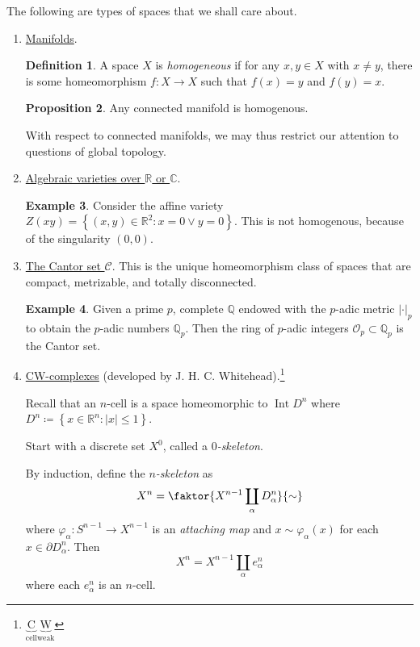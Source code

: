 \documentclass[10pt,letterpaper,cm]{nupset}
\theoremstyle{definition}
\newtheorem{definition}{Definition}[subsection]
\newtheorem{exmp}[definition]{Example}
\theoremstyle{theorem}
\newtheorem{prop}[definition]{Proposition}
\theoremstyle{remark}
\newcommand{\C}{\mathbb C}
\newcommand{\Q}{\mathbb Q}
\newcommand{\R}{\mathbb{R}}
\newcommand{\1}{\mathbb{1}}
\newcommand{\0}{\vec 0}
\DeclareMathOperator{\Int}{Int}
\begin{document}
The following are types of spaces that we shall care about.
\begin{enumerate}
\item \underline{Manifolds}.
\begin{definition}
A space $X$ is \textit{homogeneous} if for any $x,y \in X$ with $x\ne y$, there is some homeomorphism $f: X \to X$ such that $f(x)= y$ and $f(y) =x$.
\end{definition}
\begin{prop}
Any connected manifold is homogenous. 
\end{prop}
With respect to connected manifolds, we may thus restrict our attention to questions of global topology.
\item \underline{Algebraic varieties over $\R$ or $\C$}.
\begin{exmp}
Consider the affine variety $Z(xy) =\left\{\left(x, y\right) \in \R^2 : x=0 \lor y=0\right\}$. This is not homogenous, because of the singularity $\left(0,0\right)$.  
\end{exmp}
\item \underline{The Cantor set $\mathcal{C}$}. This is the unique homeomorphism class of spaces that are compact, metrizable, and totally disconnected. 
\begin{exmp}
Given a prime $p$, complete $\Q$ endowed with the $p$-adic metric $\left\lvert{\cdot}\right\rvert_p$ to obtain the $p$-adic numbers $\Q_p$. Then the ring of $p$-adic integers $\mathcal{O}_p \subset \Q_p$ is the Cantor set.
\end{exmp}
\item \underline{CW-complexes} (developed by J. H. C. Whitehead).\footnote{$ \underbrace{\text{C}}_{\text{cell}}\underbrace{\text{W}}_{\text{weak}} $} 

Recall that an $n$-cell is a space homeomorphic to $\Int{D^n}$ where $D^n \coloneqq  \left\{x \in \R^n : \left\lvert{x}\right\rvert \leq 1\right\}$.

Start with a discrete set $X^0$, called a \textit{$0$-skeleton}. 

By induction, define the \textit{$n$-skeleton} as $$X^n = \faktor{X^{n-1} \coprod_{\alpha} D^n_{\alpha}}{\sim}$$ where $\varphi_{\alpha}: S^{n-1} \to X^{n-1}$ is an \textit{attaching map} and $x\sim \varphi_{\alpha}(x)$ for each $x\in \partial{D^n_{\alpha}}$. Then $$X^n = X^{n-1} \coprod_{\alpha} e^n_{\alpha}$$ where each $e^n_{\alpha}$ is an $n$-cell.


\end{enumerate}
\end{document}

